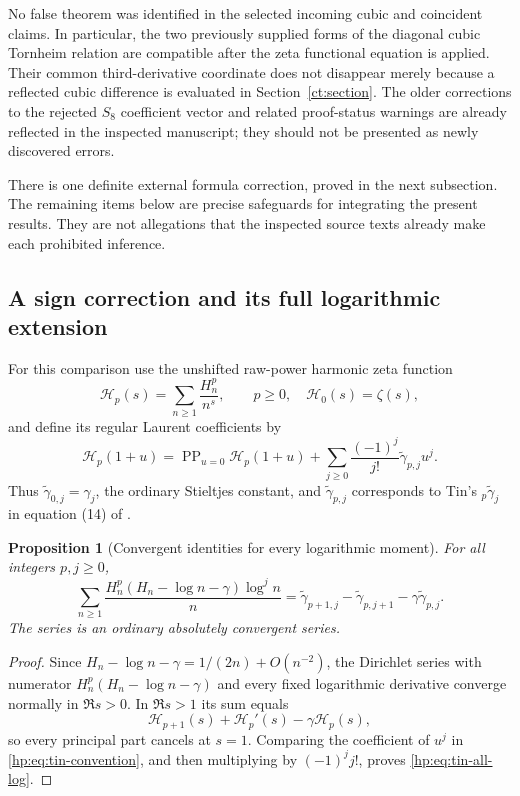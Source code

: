 \documentclass[11pt,a4paper]{article}
\numberwithin{equation}{section}
\newtheorem{proposition}[theorem]{Proposition}
\theoremstyle{definition}
\theoremstyle{remark}
\begin{document}
No false theorem was identified in the selected incoming cubic and
coincident claims. In particular, the two previously supplied forms of
the diagonal cubic Tornheim relation are compatible after the zeta
functional equation is applied. Their common third-derivative coordinate
does not disappear merely because a reflected cubic difference is
evaluated in Section~\ref{ct:section}. The older corrections to the
rejected $S_8$ coefficient vector and related proof-status warnings are
already reflected in the inspected manuscript; they should not be
presented as newly discovered errors.

There is one definite external formula correction, proved in the next
subsection. The remaining items below are precise safeguards for
integrating the present results. They are not allegations that the
inspected source texts already make each prohibited inference.


\subsection{A sign correction and its full logarithmic extension}
\label{hp:sec:tin-audit}

For this comparison use the unshifted raw-power harmonic zeta function
\[
 \mathcal H_p(s)=\sum_{n\ge1}\frac{H_n^p}{n^s},\qquad p\ge0,
 \quad \mathcal H_0(s)=\zeta(s),
\]
and define its regular Laurent coefficients by
\begin{equation}\label{hp:eq:tin-convention}
 \mathcal H_p(1+u)=\operatorname{PP}_{u=0}\mathcal H_p(1+u)
       +\sum_{j\ge0}\frac{(-1)^j}{j!}
                         \widetilde\gamma_{p,j}u^j.
\end{equation}
Thus $\widetilde\gamma_{0,j}=\gamma_j$, the ordinary Stieltjes
constant, and $\widetilde\gamma_{p,j}$ corresponds to Tin's
${}_p\widetilde\gamma_j$ in equation (14) of
\cite{hp:Tin2025}.

\begin{proposition}[Convergent identities for every logarithmic moment]
\label{hp:prop:tin-all-log}
For all integers $p,j\ge0$,
\begin{equation}\label{hp:eq:tin-all-log}
 \boxed{\quad
 \sum_{n\ge1}\frac{H_n^p(H_n-\log n-\gamma)\log^j n}{n}
   =\widetilde\gamma_{p+1,j}
        -\widetilde\gamma_{p,j+1}
        -\gamma\widetilde\gamma_{p,j}.\quad}
\end{equation}
The series is an ordinary absolutely convergent series.
\end{proposition}
\begin{proof}
Since $H_n-\log n-\gamma=1/(2n)+O(n^{-2})$, the Dirichlet
series with numerator $H_n^p(H_n-\log n-\gamma)$ and every fixed
logarithmic derivative converge normally in $\Re s>0$. In $\Re s>1$
its sum equals
\[
 \mathcal H_{p+1}(s)+\mathcal H_p'(s)-\gamma\mathcal H_p(s),
\]
so every principal part cancels at $s=1$. Comparing the coefficient
of $u^j$ in \eqref{hp:eq:tin-convention}, and then multiplying by
$(-1)^j j!$, proves \eqref{hp:eq:tin-all-log}.
\end{proof}
\end{document}

